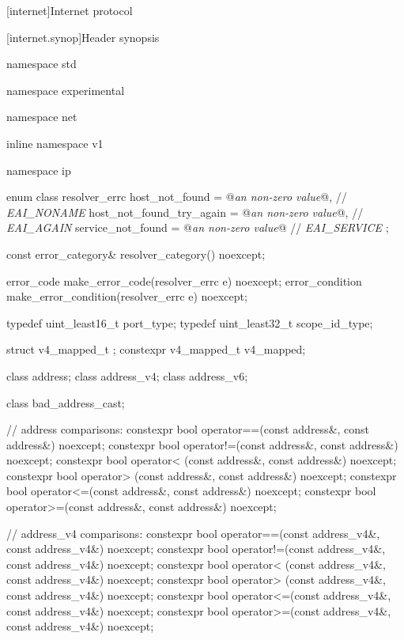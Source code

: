 
[internet]{Internet protocol}


%
[internet.synop]{Header  synopsis}

%
%
%
%
\begin{codeblock}
namespace std {
namespace experimental {
namespace net {
inline namespace v1 {
namespace ip {

  enum class resolver_errc {
    host_not_found = @\textit{an  non-zero value}@, // \textit{EAI_NONAME}
    host_not_found_try_again = @\textit{an  non-zero value}@, // \textit{EAI_AGAIN}
    service_not_found = @\textit{an  non-zero value}@ // \textit{EAI_SERVICE}
  };

  const error_category& resolver_category() noexcept;

  error_code make_error_code(resolver_errc e) noexcept;
  error_condition make_error_condition(resolver_errc e) noexcept;

  typedef uint_least16_t port_type;
  typedef uint_least32_t scope_id_type;

  struct v4_mapped_t {};
  constexpr v4_mapped_t v4_mapped;

  class address;
  class address_v4;
  class address_v6;

  class bad_address_cast;

  // address comparisons:
  constexpr bool operator==(const address&, const address&) noexcept;
  constexpr bool operator!=(const address&, const address&) noexcept;
  constexpr bool operator< (const address&, const address&) noexcept;
  constexpr bool operator> (const address&, const address&) noexcept;
  constexpr bool operator<=(const address&, const address&) noexcept;
  constexpr bool operator>=(const address&, const address&) noexcept;

  // address_v4 comparisons:
  constexpr bool operator==(const address_v4&, const address_v4&) noexcept;
  constexpr bool operator!=(const address_v4&, const address_v4&) noexcept;
  constexpr bool operator< (const address_v4&, const address_v4&) noexcept;
  constexpr bool operator> (const address_v4&, const address_v4&) noexcept;
  constexpr bool operator<=(const address_v4&, const address_v4&) noexcept;
  constexpr bool operator>=(const address_v4&, const address_v4&) noexcept;

}}}}}
\end{codeblock}
